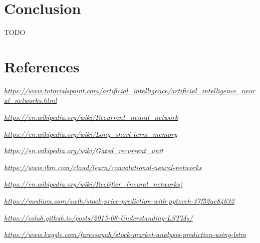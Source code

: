 \documentclass{article}
\begin{document}
\section{Conclusion}
TODO


\section{References}


\textit{\url{https://www.tutorialspoint.com/artificial_intelligence/artificial_intelligence_neural_networks.html}}

\textit{\url{https://en.wikipedia.org/wiki/Recurrent_neural_network}}

\textit{\url{https://en.wikipedia.org/wiki/Long_short-term_memory}}

\textit{\url{https://en.wikipedia.org/wiki/Gated_recurrent_unit}}

\textit{\url{https://www.ibm.com/cloud/learn/convolutional-neural-networks}}

\textit{\url{https://en.wikipedia.org/wiki/Rectifier_(neural_networks)}}

\textit{\url{https://medium.com/swlh/stock-price-prediction-with-pytorch-37f52ae84632}}

\textit{\url{https://colah.github.io/posts/2015-08-Understanding-LSTMs/}}

\textit{\url{https://www.kaggle.com/faressayah/stock-market-analysis-prediction-using-lstm}}
\end{document}
